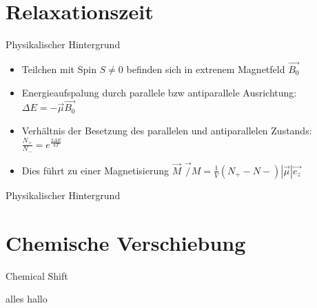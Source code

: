 
\thispagestyle{empty}
\frame{\titlepage}


\section{Relaxationszeit}
\begin{frame}{Physikalischer Hintergrund}
	\begin{itemize}
	\item Teilchen mit Spin $S\neq 0$ befinden sich in extrenem Magnetfeld $\vec{B_{0}}$
	\item Energieaufspalung durch parallele bzw antiparallele Ausrichtung:
	$\Delta E = -\vec{\mu}\vec{B_{0}}$
	\item Verhältnis der Besetzung des parallelen und antiparallelen Zustands:
	$\frac{N_{+}}{N_{-}}=e^{\frac{2\Delta E}{kT}}$
	\item Dies führt zu einer Magnetisierung $\vec{M}$
	$\vec/{M}=\frac{1}{V}(N_{+}-N{-})|\vec{\mu}|\vec{e_{z}}$
	\end{itemize}
\end{frame}

\begin{frame}{Physikalischer Hintergrund}
\end{frame}




\section{Chemische Verschiebung}
\begin{frame}{Chemical Shift}
\begin{exampleblock}{alles}
hallo
\end{exampleblock}
\end{frame}





